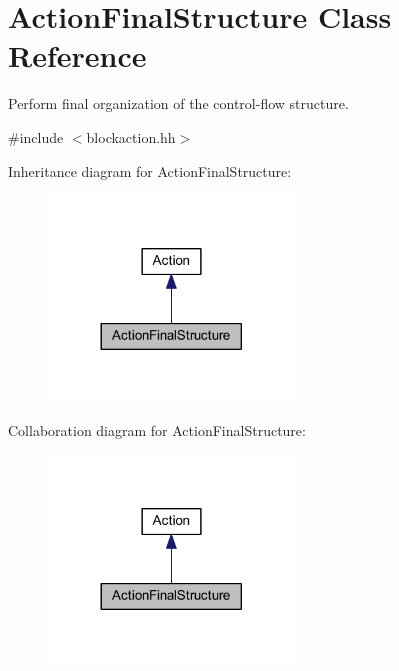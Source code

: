 \hypertarget{class_action_final_structure}{}\section{Action\+Final\+Structure Class Reference}
\label{class_action_final_structure}


Perform final organization of the control-\/flow structure.  




{\ttfamily \#include $<$blockaction.\+hh$>$}



Inheritance diagram for Action\+Final\+Structure\+:
\nopagebreak
\begin{figure}[H]
\begin{center}
\leavevmode
\includegraphics[width=185pt]{class_action_final_structure__inherit__graph}
\end{center}
\end{figure}


Collaboration diagram for Action\+Final\+Structure\+:
\nopagebreak
\begin{figure}[H]
\begin{center}
\leavevmode
\includegraphics[width=185pt]{class_action_final_structure__coll__graph}
\end{center}
\end{figure}
